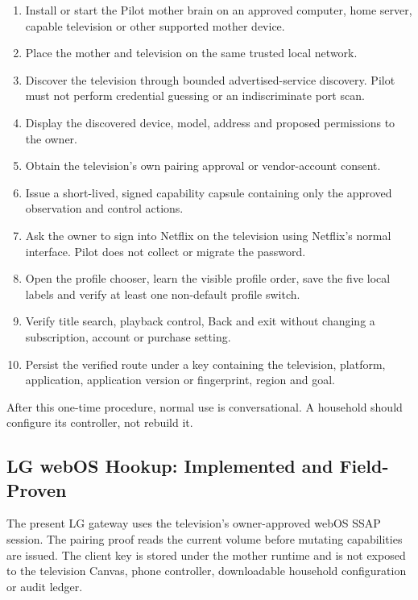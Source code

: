 \begin{enumerate}
  \item Install or start the Pilot mother brain on an approved computer, home
        server, capable television or other supported mother device.
  \item Place the mother and television on the same trusted local network.
  \item Discover the television through bounded advertised-service discovery.
        Pilot must not perform credential guessing or an indiscriminate port
        scan.
  \item Display the discovered device, model, address and proposed permissions to
        the owner.
  \item Obtain the television's own pairing approval or vendor-account consent.
  \item Issue a short-lived, signed capability capsule containing only the
        approved observation and control actions.
  \item Ask the owner to sign into Netflix on the television using Netflix's
        normal interface. Pilot does not collect or migrate the password.
  \item Open the profile chooser, learn the visible profile order, save the five
        local labels and verify at least one non-default profile switch.
  \item Verify title search, playback control, Back and exit without changing a
        subscription, account or purchase setting.
  \item Persist the verified route under a key containing the television,
        platform, application, application version or fingerprint, region and
        goal.
\end{enumerate}

After this one-time procedure, normal use is conversational. A household should
configure its controller, not rebuild it.

\subsection{LG webOS Hookup: Implemented and Field-Proven}

The present LG gateway uses the television's owner-approved webOS SSAP session.
The pairing proof reads the current volume before mutating capabilities are
issued. The client key is stored under the mother runtime and is not exposed to
the television Canvas, phone controller, downloadable household configuration or
audit ledger.

